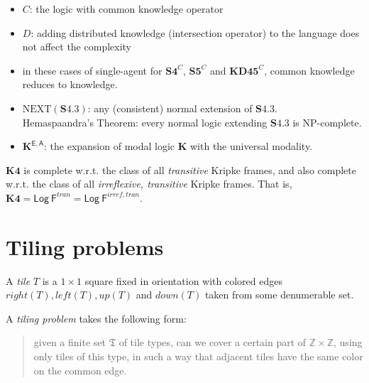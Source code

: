 \documentclass[a4paper,12pt,landscape]{article}
\begin{document}
\begin{table}[htp!]
\begin{itemize}
    \item $C$: the logic with common knowledge operator
    \item $D$: adding distributed knowledge (intersection operator) to the language does not affect the complexity
    
    \item  in these cases of single-agent for $\mathbf{S4}^C$, $\mathbf{S5}^C$ and $\mathbf{KD45}^C$, 
     common knowledge reduces to knowledge. 

     \item 
     $\mathrm{NEXT}(\mathbf{S4.3})$: any (consistent) normal extension of $\mathbf{S4.3}$. \\
     \textsf{Hemaspaandra's Theorem}: every normal logic extending $\mathbf{S4.3}$ is NP-complete.

     \item 
     $\mathbf{K}^{\mathsf{E,A}}$: 
     the expansion of modal logic $\mathbf{K}$ with the universal modality.
\end{itemize}




\end{table}




\vspace{3em}



$\mathbf{K4}$ is complete w.r.t. the class of all \textit{transitive} Kripke frames, 
and also complete w.r.t. the class of all {\color{purple} \textit{irreflexive, transitive}} Kripke frames. 
That is, 
$\mathbf{K4} = \mathsf{Log}~\mathsf{F}^{tran} = \mathsf{Log}~\mathsf{F}^{irref,tran}$.






\clearpage
\section{Tiling problems}

A \textit{tile} $T$ is a $1 \times 1$ square fixed in orientation with colored edges $right(T), left(T), up(T)$ and $down(T)$ taken from some denumerable set.


A \textit{tiling problem} takes the following form:
\begin{quotation}
    given a finite set $\mathfrak{T}$ of tile types, 
    can we cover a {\color{purple} certain part} of $\mathbb{Z} \times \mathbb{Z}$, 
    using only tiles of this type, 
    in such a way that adjacent tiles have the same color on the common edge.
\end{quotation}
\end{document}
